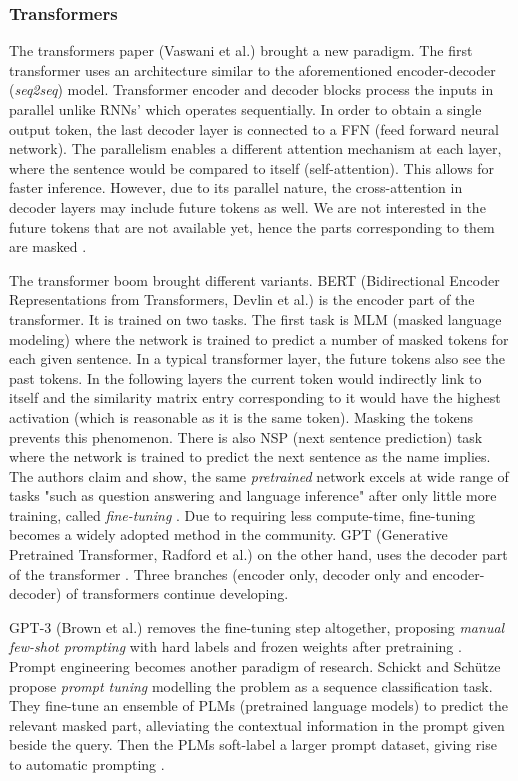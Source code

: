 \documentclass{article}
\begin{document}
\subsubsection{Transformers}
The transformers paper (Vaswani et al.) brought a new paradigm. The first transformer uses an architecture similar to the aforementioned encoder-decoder (\textit{seq2seq}) model. Transformer encoder and decoder blocks process the inputs in parallel unlike RNNs' which operates sequentially. In order to obtain a single output token, the last decoder layer is connected to a FFN (feed forward neural network). The parallelism enables a different attention mechanism at each layer, where the sentence would be compared to itself (self-attention). This allows for faster inference. However, due to its parallel nature, the cross-attention in decoder layers may include future tokens as well. We are not interested in the future tokens that are not available yet, hence the parts corresponding to them are masked \cite{vaswani_attention_2023}.

The transformer boom brought different variants. BERT (Bidirectional Encoder Representations from Transformers, Devlin et al.) is the encoder part of the transformer. It is trained on two tasks. The first task is MLM (masked language modeling) where the network is trained to predict a number of masked tokens for each given sentence. In a typical transformer layer, the future tokens also see the past tokens. In the following layers the current token would indirectly link to itself and the similarity matrix entry corresponding to it would have the highest activation (which is reasonable as it is the same token). Masking the tokens prevents this phenomenon. There is also NSP (next sentence prediction) task where the network is trained to predict the next sentence as the name implies. The authors claim and show, the same \textit{pretrained} network excels at wide range of tasks "such as question answering and language inference" after only little more training, called \textit{fine-tuning} \cite{devlin_bert_2019}. Due to requiring less compute-time, fine-tuning becomes a widely adopted method in the community. GPT (Generative Pretrained Transformer, Radford et al.) on the other hand, uses the decoder part of the transformer \cite{radford_improving_2018}. Three branches (encoder only, decoder only and encoder-decoder) of transformers continue developing.

GPT-3 (Brown et al.) removes the fine-tuning step altogether, proposing \textit{manual few-shot prompting} with hard labels and frozen weights after pretraining \cite{brown_language_2020}. Prompt engineering becomes another paradigm of research. Schickt and Schütze propose \textit{prompt tuning} modelling the problem as a sequence classification task. They fine-tune an ensemble of PLMs (pretrained language models) to predict the relevant masked part, alleviating the contextual information in the prompt given beside the query. Then the PLMs soft-label a larger prompt dataset, giving rise to automatic prompting \cite{schick_exploiting_2021}.
\end{document}
